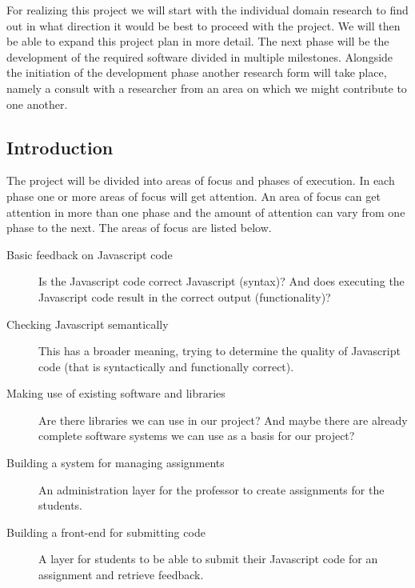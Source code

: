 \documentclass{article}
\begin{document}

For realizing this project we will start with the individual domain research to 
find out in what direction it would be best to proceed with the project. We will 
then be able to expand this project plan in more detail. The next phase will be 
the development of the required software divided in multiple milestones. 
Alongside the initiation of the development phase another research form will 
take place, namely a consult with a researcher from an area on which we might 
contribute to one another. 

\subsection{Introduction} 


The project will be divided into areas of focus and phases of execution. In each 
phase one or more areas of focus will get attention. An area of focus can get 
attention in more than one phase and the amount of attention can vary from one 
phase to the next. The areas of focus are listed below. 

\begin{description}\item[Basic feedback on Javascript code] 
Is the Javascript code correct Javascript (syntax)? And does executing the 
Javascript code result in the correct output (functionality)? 
\item[Checking Javascript 
semantically] This has a broader meaning, trying to determine the quality of 
Javascript code (that is syntactically and functionally correct). \item[Making 
use of existing software and libraries] Are there libraries we can use in our 
project? And maybe there are already complete software systems we can use as a 
basis for our project? \item[Building a system for managing assignments] An 
administration layer for the professor to create assignments for the students. 
\item[Building a front-end for submitting code] A layer for students to be 
able to submit their Javascript code for an assignment and retrieve feedback. 
\end{description} 
\end{document}
